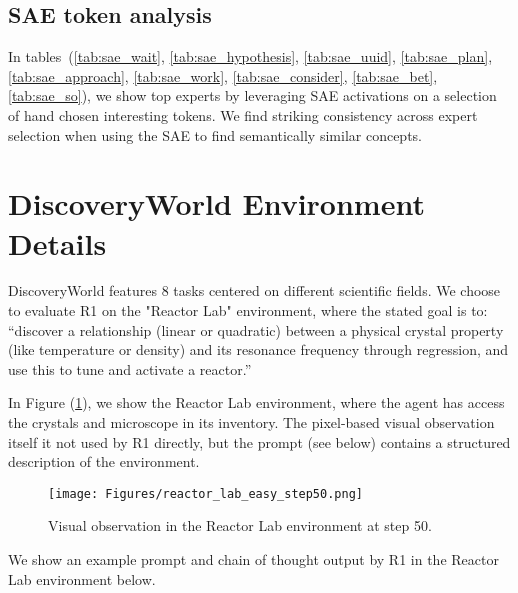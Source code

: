 \subsection{SAE token analysis} \label{apd:more_sae_tables}


In tables~(\ref{tab:sae_wait}, \ref{tab:sae_hypothesis}, \ref{tab:sae_uuid}, \ref{tab:sae_plan}, \ref{tab:sae_approach}, \ref{tab:sae_work}, \ref{tab:sae_consider}, \ref{tab:sae_bet}, \ref{tab:sae_so}), we show top experts by leveraging SAE activations on a selection of hand chosen interesting tokens. We find striking consistency across expert selection when using the SAE to find semantically similar concepts.

\section{DiscoveryWorld Environment Details}
\label{app:discodetails}
DiscoveryWorld features 8 tasks centered on different scientific fields. We choose to evaluate R1 on the "Reactor Lab" environment, where the stated goal is to: ``discover a relationship (linear or quadratic) between a physical crystal property (like temperature or density) and its resonance frequency through regression, and use this to tune and activate a reactor.''

In Figure (\ref{fig:dw_reactor_pic}), we show the Reactor Lab environment, where the agent has access the crystals and microscope in its inventory. The pixel-based visual observation itself it not used by R1 directly, but the prompt (see below) contains a structured description of the environment. 

\begin{figure}[ht]
    \centering
    \texttt{[image: Figures/reactor\_lab\_easy\_step50.png]} 
    \caption{Visual observation in the Reactor Lab environment at step 50.}
    \label{fig:dw_reactor_pic}
\end{figure}

We show an example prompt and chain of thought output by R1 in the Reactor Lab environment below. 

\onecolumn


\begin{tcolorbox}[colback=green!5!white, colframe=green!75!black, title=Example Prompt on DiscoveryWorld Reactor Lab, breakable]
{\small  }
\end{tcolorbox}

\begin{tcolorbox}[colback=orange!5!white, colframe=orange!75!black, title=Example Reasoning Output from DeepSeek-R1 (step 50), breakable, width=\textwidth]
{\small  }
\end{tcolorbox}
